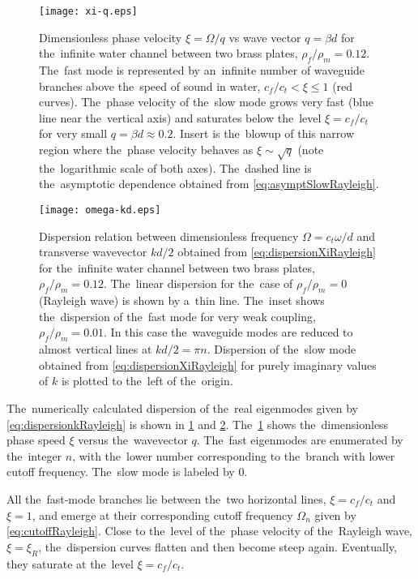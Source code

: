 \begin{figure}
\begin{center}
\texttt{[image: xi-q.eps]}
\caption{Dimensionless phase velocity $\xi=\Omega/q$ vs wave vector $q=\beta d$ for the~infinite water channel between two brass plates, $\rho_f/\rho_m = 0.12$. The~fast mode is represented by an~infinite number of waveguide branches above the~speed of sound in water, $c_f/c_t< \xi \le 1$ (red curves). The~phase velocity of the~slow mode grows very fast (blue line near the~vertical axis) and saturates below the~level $\xi= c_f/c_t$ for very small $q= \beta d \approx 0.2$. Insert is the~blowup of this narrow region where the~phase velocity behaves as $\xi \sim \sqrt{q}$ (note the~logarithmic scale of both axes). The~dashed line is the~asymptotic dependence obtained from \cref{eq:asymptSlowRayleigh}. }
\label{fig:xi-q}
\end{center}
\end{figure}


\begin{figure}
\begin{center}
\texttt{[image: omega-kd.eps]}
\caption{Dispersion relation between dimensionless frequency $\Omega=c_t \omega/d$ and transverse wavevector $kd/2$ obtained from \cref{eq:dispersionXiRayleigh} for the~infinite water channel between two brass plates, $\rho_f/\rho_m = 0.12$. The~linear dispersion for the~case of $\rho_f/\rho_m = 0$ (Rayleigh wave) is shown by a~thin line. The~inset shows the~dispersion of the~fast mode for very weak coupling, $\rho_f/\rho_m = 0.01$. In this case the~waveguide modes are reduced to almost vertical lines at $k d/2 = \pi n$. Dispersion of the~slow mode obtained from \cref{eq:dispersionXiRayleigh} for purely imaginary values of $k$ is plotted to the~left of the~origin.}
\label{fig:spectr}
\end{center}
\end{figure}


The~numerically calculated dispersion of the~real eigenmodes given by \cref{eq:dispersionkRayleigh} is shown in \cref{fig:xi-q} and \cref{fig:spectr}.
The~\cref{fig:xi-q} shows the~dimensionless phase speed $\xi$ versus the~wavevector $q$.
The~fast eigenmodes are enumerated by the~integer $n$, with the~lower number corresponding to the~branch with lower cutoff frequency.
The~slow mode is labeled by $0$.

All the~fast-mode branches lie between the~two horizontal lines, $\xi=c_f/c_t$ and $\xi=1$, and emerge at their corresponding cutoff frequency $\Omega_n$ given by \cref{eq:cutoffRayleigh}.
Close to the~level of the~phase velocity of the~Rayleigh wave, $\xi=\xi_R$, the~dispersion curves flatten and then become steep again.
Eventually, they saturate at the~level $\xi=c_f/c_t$.

